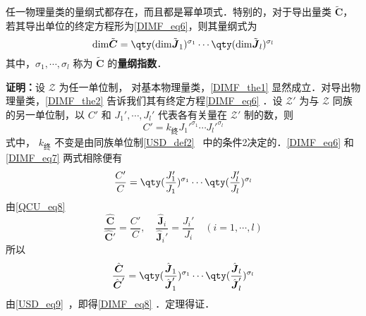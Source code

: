 \begin{theorem}{}\label{DIMF_the1}
任一物理量类的量纲式都存在，而且都是幂单项式．特别的，对于导出量类 $\tilde{\boldsymbol{C}}$，若其导出单位的终定方程形为\autoref{DIMF_eq6}，则其量纲式为
\begin{equation}\label{DIMF_eq8}
\mathrm{dim}\tilde{\boldsymbol{C}}=\qty(\mathrm{dim}\tilde{\boldsymbol{J}}_1)^{\sigma_1}\cdots\qty(\mathrm{dim}\tilde{\boldsymbol{J}}_l)^{\sigma_l}
\end{equation}
其中，$\sigma_1,\cdots,\sigma_l$ 称为 $\tilde{\boldsymbol{C}}$ 的\textbf{量纲指数}．
\end{theorem}
\textbf{证明：}设 $\mathscr{Z}$ 为任一单位制， 对基本物理量类，\autoref{DIMF_the1} 显然成立．对导出物理量类，\autoref{DIMF_the2} 告诉我们其有终定方程\autoref{DIMF_eq6} ．设 $\mathscr{Z'}$ 为与 $\mathscr{Z}$ 同族的另一单位制，以 $C'$ 和 $J_1',\cdots,J_l'$ 代表各有关量在 $\mathscr{Z'}$ 制的数，则
\begin{equation}\label{DIMF_eq7}
C'=k_{\text{终}}J_1'^{\sigma_1}\cdots J_l'^{\sigma_l}
\end{equation}
 式中， $k_{\text{终}}$ 不变是由同族单位制\autoref{USD_def2}~ 中的条件2决定的．\autoref{DIMF_eq6} 和\autoref{DIMF_eq7} 两式相除便有
 \begin{equation}
 \frac{C'}{C}=\qty(\frac{J_1'}{J_1})^{\sigma_1}\cdots\qty(\frac{J_l'}{J_l})^{\sigma_l}
 \end{equation}
 由\autoref{QCU_eq8}~
 \begin{equation}
 \frac{\hat{\boldsymbol{C}}}{\hat{\boldsymbol{C}}'}=\frac{C'}{C}, \quad\frac{\hat{\boldsymbol{J}}_i}{\hat{\boldsymbol{J}}_i'}=\frac{J_i'}{J_i}\quad (i=1,\cdots ,l)
 \end{equation}
 所以
 \begin{equation}
 \frac{\hat{\boldsymbol{C}}}{\hat{\boldsymbol{C}}'}=\qty(\frac{\hat{\boldsymbol{J}}_1}{\hat{\boldsymbol{J}}_1'})^{\sigma_1}\cdots\qty(\frac{\hat{\boldsymbol{J}}_l}{\hat{\boldsymbol{J}}_l'})^{\sigma_l}
 \end{equation}
 由\autoref{USD_eq9}~，即得\autoref{DIMF_eq8} ．定理得证．

